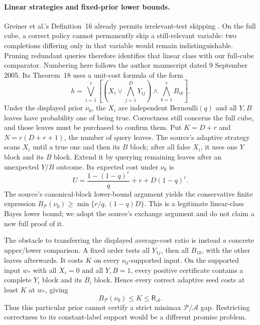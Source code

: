 \documentclass[pdflatex,sn-mathphys-num]{sn-jnl}
\newcommand{\RR}{\mathsf{R}}
\theoremstyle{thmstyleone}
\theoremstyle{thmstylethree}
\theoremstyle{thmstyletwo}
\begin{document}
\paragraph*{Linear strategies and fixed-prior lower bounds.}
Greiner et al.'s Definition~16 already permits irrelevant-test skipping
\cite{greiner}. On the full cube, a correct policy cannot permanently
skip a still-relevant variable: two completions differing only in that
variable would remain indistinguishable. Pruning redundant queries
therefore identifies that linear class with our full-cube comparator.
Numbering here follows the author manuscript dated
9 September 2005. Its Theorem~18 uses a unit-cost formula of the form
\[
 h=\bigvee_{i=1}^{r}
 \left[\left(X_i\lor\bigwedge_{j=1}^{D}Y_{ij}\right)
       \land\bigwedge_{k=1}^{r}B_{ik}\right].
\]
Under the displayed prior $\nu_0$, the $X_i$ are independent
Bernoulli$(q)$ and all $Y,B$ leaves have probability one of being true.
Correctness still concerns the full cube, and those leaves must be
purchased to confirm them. Put $K=D+r$ and $N=r(D+r+1)$, the number
of query leaves. The source's adaptive strategy scans $X_i$ until a
true one and then its $B$ block; after all false $X_i$, it uses one
$Y$ block and its $B$ block. Extend it by querying remaining leaves
after an unexpected $Y/B$ outcome. Its expected cost under $\nu_0$ is
\[
 U=\frac{1-(1-q)^r}{q}+r+D(1-q)^r.
\]
The source's canonical-block lower-bound argument yields the
conservative finite expression
$B_{\mathcal P}(\nu_0)\geq\min\{r/q,(1-q)D\}$.
This is a legitimate linear-class Bayes lower bound; we adopt the
source's exchange argument and do not claim a new full proof of it.

The obstacle to transferring the displayed average-cost ratio is
instead a concrete upper/lower comparison. A fixed order tests all
$Y_{1j}$, then all $B_{1k}$, with the other leaves afterwards. It
costs $K$ on every $\nu_0$-supported input. On the supported input
$w_*$ with all $X_i=0$ and all $Y,B=1$, every positive certificate
contains a complete $Y_i$ block and its $B_i$ block. Hence every
correct adaptive seed costs at least $K$ at $w_*$, giving
\[
 B_{\mathcal P}(\nu_0)\leq K\leq\RR_{\mathcal A}.
\]
Thus this particular prior cannot certify a strict minimax
$\mathcal P/\mathcal A$ gap. Restricting correctness to its
constant-label support would be a different promise problem.
\end{document}
